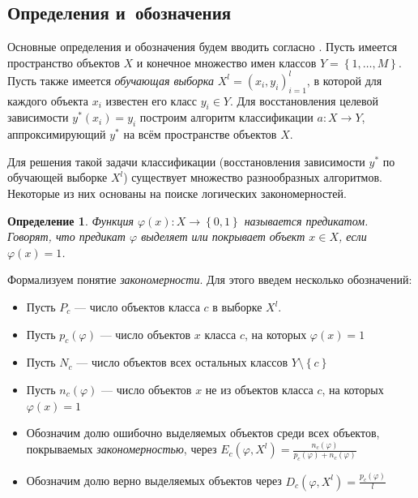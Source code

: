 \documentclass[12pt]{article}
\newtheorem{definition}{Определение}
\begin{document}
\subsection{Определения и~обозначения}
\label{subsec:defs}



Основные определения и обозначения будем вводить согласно
\cite{voron10logicalgs}. Пусть имеется пространство объектов \(X\) и
конечное множество имен классов \(Y = \left\{1, \dots,
M\right\}\). Пусть также имеется \emph{обучающая выборка} \(X^{l} =
(x_i, y_i)_{i = 1}^{l}\), в которой для каждого объекта \(x_i\)
известен его класс \(y_i \in Y\).  Для восстановления целевой
зависимости \(y^{*}(x_i) = y_i\) построим алгоритм классификации
\(a\colon X \rightarrow Y\), аппроксимирующий \(y^{*}\) на всём
пространстве объектов \(X\).

Для решения такой задачи классификации (восстановления зависимости
\(y^{*}\) по обучающей выборке \(X^l\)) существует множество
разнообразных алгоритмов. Некоторые из них основаны на поиске
логических закономерностей.

\begin{definition}
  Функция \(\varphi(x) \colon X \rightarrow \left\{0, 1\right\}\)
  называется \emph{предикатом}. Говорят, что предикат
  \(\varphi\) \emph{выделяет} или \emph{покрывает} объект \(x \in X\),
  если \(\varphi(x) = 1\).
\end{definition}

Формализуем понятие \emph{закономерности}. Для этого введем несколько
обозначений:

\begin{itemize}
\item Пусть \(P_c\) --- число объектов класса \(c\) в выборке \(X^l\).
\item Пусть \(p_c(\varphi)\) --- число объектов \(x\) класса \(c\), на
  которых \(\varphi(x) = 1\)
\item Пусть \(N_c\) --- число объектов всех остальных классов \(Y
  \setminus \left\{c\right\}\)
\item Пусть \(n_c(\varphi)\) --- число объектов \(x\) не из объектов
  класса \(c\), на которых \(\varphi(x) = 1\)
\item Обозначим долю ошибочно выделяемых объектов среди всех объектов,
  покрываемых \emph{закономерностью}, через \(E_c(\varphi, X^l) =
  \frac{n_c(\varphi)}{p_c(\varphi) + n_c(\varphi)}\)
\item Обозначим долю верно выделяемых объектов через \(D_c(\varphi,
  X^l) = \frac{p_c(\varphi)}{l}\)
\end{itemize}
\end{document}

